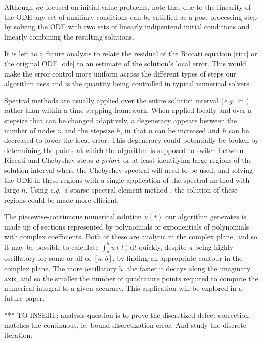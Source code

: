 \documentclass[10pt]{article}
\newcommand{\eg}{{\it e.g.\ }}
\begin{document}
Although we focused on initial value problems, note that due to the linearity
of the ODE any set of auxiliary conditions can be satisfied as a
post-processing step by solving the ODE with two sets of linearly indipentend
initial conditions and linearly combining the resulting solutions.

It is left to a future analysis to relate the residual of the Riccati equation
\cref{ricc} or the original ODE \cref{ode} to an estimate of the solution's
local error. This would make the error control more uniform across the
different types of steps our algorithm uses and is the quantity being
controlled in typical numerical solvers.  

Spectral methods are usually applied over the entire solution interval (\eg in
\cite{driscoll2008}) rather than within a time-stepping framework. When applied
locally and over a stepsize that can be changed adaptively, a degeneracy
appears between the number of nodes $n$ and the stepsize $h$, in that $n$ can
be increased and $h$ can be decreased to lower the local error. This degeneracy
could potentially be broken by determining the points at which the algorithm is
supposed to switch between Riccati and Chebyshev steps \emph{a priori}, or at
least identifying large regions of the solution interval where the Chebyshev
spectral will need to be used, and solving the ODE in these regions with a
single application of the spectral method with large $n$. Using \eg a sparse
spectral element method \cite{fortunato2021}, the solution of these regions
could be made more efficient.

The piecewise-continuous numerical solution $\tilde{u}(t)$ our algorithm generates is made up
of sections represented by polynomials or exponentials of polynomials with
complex coefficients. Both of these are analytic in the complex plane, and so
it may be possible to calculate $\int_a^b \tilde{u}(t)\mathrm{d}t$ quickly,
despite $\tilde{u}$ being highly oscillatory for some or all of $[a, b]$, by
finding an appropriate contour in the complex plane. The more oscillatory
$\tilde{u}$, the faster it decays along the imaginary axis, and so the smaller
the number of quadrature points required to compute the numerical integral to a
given accuracy. This application will be explored in a future paper.

*** TO INSERT: analysis question is to prove the discretized
defect correction matches the continuous, ie, bound discretization error.
And study the discrete iteration.
\end{document}
